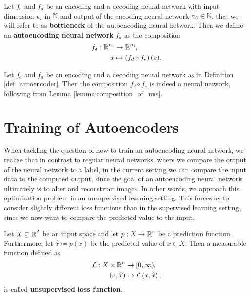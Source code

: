 \begin{definition}\label{def_autoencoder}
Let $f_e$ and $f_d$ be an encoding and a decoding neural network with input dimension $n_i$ in $\operatorname{\mathbb{N}}$ and output of the encoding neural network $n_b \in \operatorname{\mathbb{N}}$, that we will refer to as \textbf{bottleneck} of the autoencoding neural network.
Then we define an \textbf{autoencoding neural network} $f_a$ as the composition
\begin{align*}
f_a: \operatorname{\mathbb{R}}^{n_i} &\to \operatorname{\mathbb{R}}^{n_i},\\
x &\mapsto \left(f_d \circ f_e \right)(x).
\end{align*}
\end{definition}

\begin{remark}
Let $f_e$ and $f_d$ be an encoding and a decoding neural network as in Definition \ref{def_autoencoder}. Then the composition $f_d \circ f_e$ is indeed a neural network, following from Lemma \ref{lemma:composition_of_nns}.
\end{remark}


\section{Training of Autoencoders}

When tackling the question of how to train an autoencoding neural network, we realize that in contrast to regular neural networks, where we compare the output of the neural network to a label, in the current setting we can compare the input data to the computed output, since the goal of an autoencoding neural network ultimately is to alter and reconstruct images. In other words, we approach this optimization problem in an unsupervised learning setting. This forces us to consider slightly different loss functions than in the supervised learning setting, since we now want to compare the predicted value to the input.


\begin{definition}
Let $X\subseteq \operatorname{\mathbb{R}}^{d}$ be an input space and let $p:X\to \operatorname{\mathbb{R}}^{n}$ be a prediction function. Furthermore, let $\hat{x}\coloneqq p(x)$ be the predicted value of $x\in X$. Then a measurable function defined as
\begin{align*}
\operatorname{\mathcal{L}}:X \times \operatorname{\mathbb{R}}^{n} &\to [0, \infty),\\
\left(x, \widehat{x}\right) &\mapsto \operatorname{\mathcal{L}}\left(x, \widehat{x}\right),
\end{align*}
is called \textbf{unsupervised loss function}.
\end{definition}


